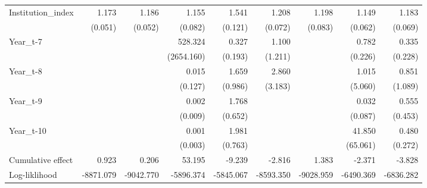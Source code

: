 \begin{table}[htbp]
\begin{tabular}{l*{8}{D{.}{.}{-1}}}
Institution\_index&       1.173\sym{***}&       1.186\sym{***}&       1.155\sym{**} &       1.541\sym{***}&       1.208\sym{***}&       1.198\sym{***}&       1.149\sym{***}&       1.183\sym{***}\\
            &     (0.051)         &     (0.052)         &     (0.082)         &     (0.121)         &     (0.072)         &     (0.083)         &     (0.062)         &     (0.069)         \\
Year\_t-7    &                     &                     &     528.324         &       0.327\sym{*}  &       1.100         &                     &       0.782         &       0.335\sym{\%}  \\
            &                     &                     &  (2654.160)         &     (0.193)         &     (1.211)         &                     &     (0.226)         &     (0.228)         \\
Year\_t-8    &                     &                     &       0.015         &       1.659         &       2.860         &                     &       1.015         &       0.851         \\
            &                     &                     &     (0.127)         &     (0.986)         &     (3.183)         &                     &     (5.060)         &     (1.089)         \\
Year\_t-9    &                     &                     &       0.002         &       1.768\sym{\%}  &                     &                     &       0.032         &       0.555         \\
            &                     &                     &     (0.009)         &     (0.652)         &                     &                     &     (0.087)         &     (0.453)         \\
Year\_t-10   &                     &                     &       0.001         &       1.981\sym{*}  &                     &                     &      41.850\sym{**} &       0.480         \\
            &                     &                     &     (0.003)         &     (0.763)         &                     &                     &    (65.061)         &     (0.272)         \\
\midrule
Cumulative effect&       0.923         &       0.206         &      53.195         &      -9.239         &      -2.816         &       1.383         &      -2.371         &      -3.828         \\
 Log-liklihood&   -8871.079         &   -9042.770         &   -5896.374         &   -5845.067         &   -8593.350         &   -9028.959         &   -6490.369         &   -6836.282         \\

\end{tabular}
\end{table}
